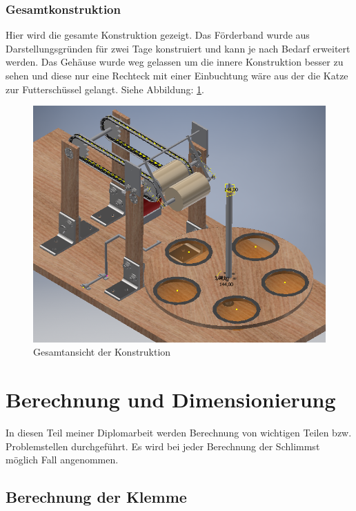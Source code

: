 \subsubsection{Gesamtkonstruktion}

Hier wird die gesamte Konstruktion gezeigt. Das Förderband wurde aus Darstellungsgründen für zwei Tage konstruiert und kann je nach Bedarf erweitert werden. Das Gehäuse wurde weg gelassen um die innere Konstruktion besser zu sehen und diese nur eine Rechteck mit einer Einbuchtung wäre aus der die Katze zur Futterschüssel gelangt. Siehe Abbildung: \ref{Gesamt_Ansicht_Inventor}.

\begin{figure}[H]
\begin{center}
\includegraphics[width=12cm]{Bilder/Inventor/Gesamt_Ansicht}
\caption{Gesamtansicht der Konstruktion}
\label{Gesamt_Ansicht_Inventor} 
\end{center}
\end{figure}

\section{Berechnung und Dimensionierung}

In diesen Teil meiner Diplomarbeit werden Berechnung von wichtigen Teilen bzw. Problemstellen durchgeführt. Es wird bei jeder Berechnung der Schlimmst möglich Fall angenommen.

\subsection{Berechnung der Klemme}

